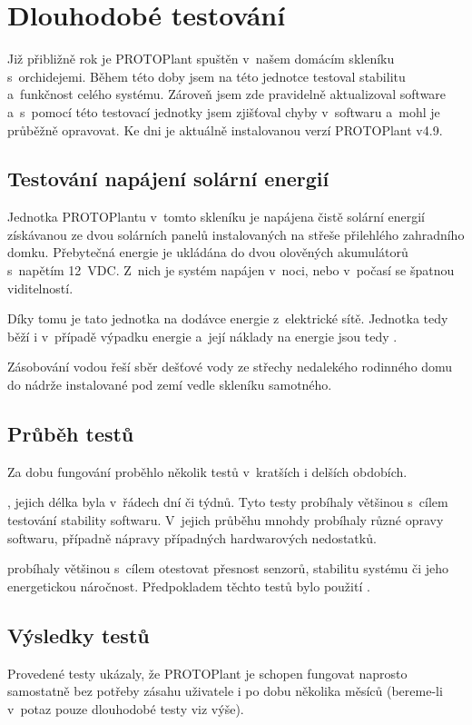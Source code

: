 \chapter{Dlouhodobé testování}
Již přibližně rok je PROTOPlant spuštěn v~našem domácím skleníku s~orchidejemi.
Během této doby jsem na této jednotce testoval stabilitu a~funkčnost celého systému. 
Zároveň jsem zde pravidelně aktualizoval software a~s~pomocí této testovací jednotky jsem zjišťoval chyby v~softwaru a~mohl je průběžně opravovat.
Ke dni  je aktuálně instalovanou verzí PROTOPlant v4.9.

\section{Testování napájení solární energií}
\label{sec:SolarPower}
Jednotka PROTOPlantu v~tomto skleníku je napájena čistě solární energií získávanou ze dvou solárních panelů instalovaných na střeše přilehlého zahradního domku.
Přebytečná energie je ukládána do dvou olověných akumulátorů s~napětím 12~VDC.
Z~nich je systém napájen v~noci, nebo v~počasí se špatnou viditelností.

Díky tomu je tato jednotka  na dodávce energie z~elektrické sítě.
Jednotka tedy běží i v~případě výpadku energie a~její náklady na energie jsou tedy .

Zásobování vodou řeší sběr dešťové vody ze střechy nedalekého rodinného domu do nádrže instalované pod zemí vedle skleníku samotného.

\section{Průběh testů}
Za dobu fungování proběhlo několik testů v~kratších i delších obdobích. \newline

\noindent{}, jejich délka byla v~řádech dní či týdnů. 
Tyto testy probíhaly většinou s~cílem testování stability softwaru.
V~jejich průběhu mnohdy probíhaly různé opravy softwaru, případně nápravy případných hardwarových nedostatků. \newline

\noindent{} probíhaly většinou s~cílem otestovat přesnost senzorů, stabilitu systému či jeho energetickou náročnost.
Předpokladem těchto testů bylo použití . 

\section{Výsledky testů}
Provedené testy ukázaly, že PROTOPlant je schopen fungovat naprosto samostatně bez potřeby zásahu uživatele i po dobu několika měsíců (bereme-li v~potaz pouze dlouhodobé testy viz výše).

\newpage